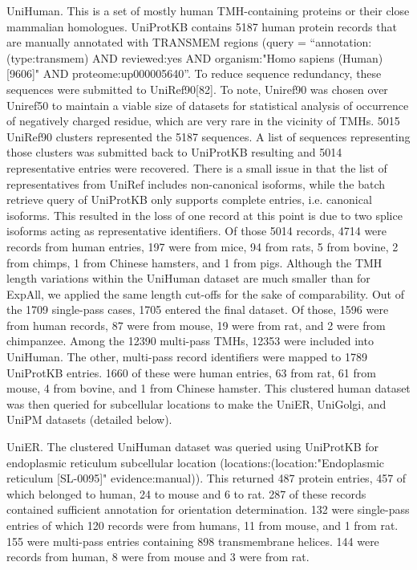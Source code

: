 UniHuman. This is a set of mostly human TMH-containing proteins or their close mammalian homologues. UniProtKB contains 5187 human protein records that are manually annotated with TRANSMEM regions (query = “annotation:(type:transmem) AND reviewed:yes AND organism:"Homo sapiens (Human) [9606]" AND proteome:up000005640”. To reduce sequence redundancy, these sequences were submitted to UniRef90[82]. To note, Uniref90 was chosen over Uniref50 to maintain a viable size of datasets for statistical analysis of occurrence of negatively charged residue, which are very rare in the vicinity of TMHs. 5015 UniRef90 clusters represented the 5187 sequences. A list of sequences representing those clusters was submitted back to UniProtKB resulting and 5014 representative entries were recovered. There is a small issue in that the list of representatives from UniRef includes non-canonical isoforms, while the batch retrieve query of UniProtKB only supports complete entries, i.e. canonical isoforms. This resulted in the loss of one record at this point is due to two splice isoforms acting as representative identifiers. Of those 5014 records, 4714 were records from human entries, 197 were from mice, 94 from rats, 5 from bovine, 2 from chimps, 1 from Chinese hamsters, and 1 from pigs. Although the TMH length variations within the UniHuman dataset are much smaller than for ExpAll, we applied the same length cut-offs for the sake of comparability. Out of the 1709 single-pass cases, 1705 entered the final dataset. Of those, 1596 were from human records, 87 were from mouse, 19 were from rat, and 2 were from chimpanzee. Among the 12390 multi-pass TMHs, 12353 were included into UniHuman. The other, multi-pass record identifiers were mapped to 1789 UniProtKB entries. 1660 of these were human entries, 63 from rat, 61 from mouse, 4 from bovine, and 1 from Chinese hamster. This clustered human dataset was then queried for subcellular locations to make the UniER, UniGolgi, and UniPM datasets (detailed below).

UniER. The clustered UniHuman dataset was queried using UniProtKB for endoplasmic reticulum subcellular location (locations:(location:"Endoplasmic reticulum [SL-0095]" evidence:manual)). This returned 487 protein entries, 457 of which belonged to human, 24 to mouse and 6 to rat. 287 of these records contained sufficient annotation for orientation determination. 132 were single-pass entries of which 120 records were from humans, 11 from mouse, and 1 from rat. 155 were multi-pass entries containing 898 transmembrane helices. 144 were records from human, 8 were from mouse and 3 were from rat.

